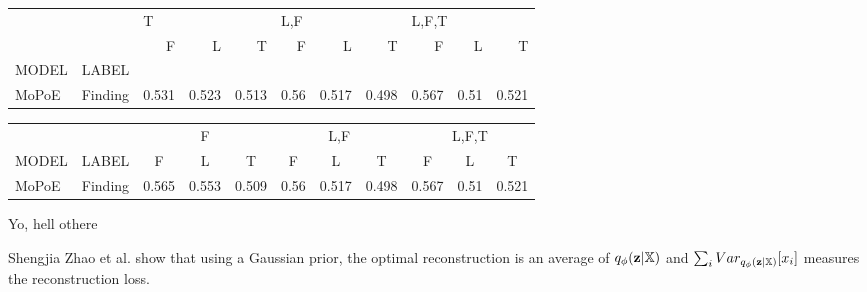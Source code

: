 \begin{tabular}{llrrrrrrrrr}
\toprule
      &         & \multicolumn{3}{l}{T} & \multicolumn{3}{l}{L,F} & \multicolumn{3}{l}{L,F,T} \\
      &         &      F &      L &      T &     F &      L &      T &      F &     L &      T \\
MODEL & LABEL &        &        &        &       &        &        &        &       &        \\
\midrule
MoPoE & Finding &  0.531 &  0.523 &  0.513 &  0.56 &  0.517 &  0.498 &  0.567 &  0.51 &  0.521 \\
\bottomrule
\end{tabular}


\begin{small} \begin{sc}\begin{tabular}{lcccccccccc}

      &         & \multicolumn{3}{c}{F} & \multicolumn{3}{c}{L,F} & \multicolumn{3}{c}{L,F,T} \\  \cmidrule(l){3-5} \cmidrule(l){6-8} \cmidrule(l){9-11} MODEL &    LABEL     &         F &         L &         T &         F &         L &         T &         F &         L &         T \\\midrule
MoPoE & Finding &  0.565 &  0.553 &  0.509 &  0.56 &  0.517 &  0.498 &  0.567 &  0.51 &  0.521 \\

\end{tabular}
\end{sc} \end{small}


Yo, hell othere

Shengjia Zhao et al. \cite{zhao2017towards} show that using a Gaussian prior, the optimal reconstruction is an average of $q_{\phi}(\textbf{z}|\mathbb{X})$ and $\sum _i Var _{q_{\phi}(\textbf{z}|\mathbb{X})} [x_i]$ measures the reconstruction loss.

